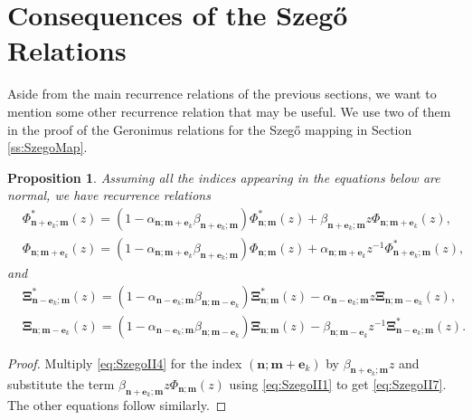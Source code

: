 \documentclass[reqno,centertags,11pt,draft]{amsart}
\newtheorem{prop}[thm]{Proposition}
\begin{document}


\section{Consequences of the Szeg\H{o} Relations}\label{ss:extra}

Aside from the main recurrence relations of the previous sections, we want to mention some other recurrence relation that may be useful. We use two of them in the proof of the Geronimus relations for the Szeg\H{o} mapping in Section \ref{ss:SzegoMap}.

\begin{prop}
Assuming all the indices appearing in the equations below are normal, we have recurrence relations
    \begin{align}\label{eq:SzegoII7}
        & \Phi_{\bm{n}+\bm{e}_k;\bm{m}}^*(z) = (1 - \alpha_{\bm{n};\bm{m}+\bm{e}_k}\beta_{\bm{n}+\bm{e}_k;\bm{m}})\Phi_{\bm{n};\bm{m}}^*(z) + \beta_{\bm{n}+\bm{e}_k;\bm{m}}z\Phi_{\bm{n};\bm{m}+\bm{e}_k}(z), \\
        & \label{eq:SzegoII8}\Phi_{\bm{n};\bm{m}+\bm{e}_k}(z) = (1 - \alpha_{\bm{n};\bm{m}+\bm{e}_k}\beta_{\bm{n}+\bm{e}_k;\bm{m}})\Phi_{\bm{n};\bm{m}}(z) + \alpha_{\bm{n};\bm{m}+\bm{e}_k}z^{-1}\Phi_{\bm{n}+\bm{e}_k;\bm{m}}^*(z), 
        \end{align}
        and 
        \begin{align}& \bm{\Xi}_{\bm{n}-\bm{e}_k;\bm{m}}^*(z) = (1-\alpha_{\bm{n}-\bm{e}_k;\bm{m}}\beta_{\bm{n};\bm{m}-\bm{e}_k})\bm{\Xi}_{\bm{n};\bm{m}}^*(z) - \alpha_{\bm{n}-\bm{e}_k;\bm{m}}z\bm{\Xi}_{\bm{n};\bm{m}-\bm{e}_k}(z), \\
        & \bm{\Xi}_{\bm{n};\bm{m}-\bm{e}_k}(z) = (1-\alpha_{\bm{n}-\bm{e}_k;\bm{m}}\beta_{\bm{n};\bm{m}-\bm{e}_k})\bm{\Xi}_{\bm{n};\bm{m}}(z) - \beta_{\bm{n};\bm{m}-\bm{e}_k}z^{-1}\bm{\Xi}_{\bm{n}-\bm{e}_k;\bm{m}}^*(z).
    \end{align}
\end{prop}
\begin{proof}
    Multiply \eqref{eq:SzegoII4} for the index $(\bm{n};\bm{m}+\bm{e}_k)$ by $\beta_{\bm{n}+\bm{e}_k;\bm{m}}z$ and substitute the term $\beta_{\bm{n}+\bm{e}_k;\bm{m}}z\Phi_{\bm{n};\bm{m}}(z)$ using \eqref{eq:SzegoII1} to get \eqref{eq:SzegoII7}. The other equations follow similarly. 
\end{proof}
\end{document}
